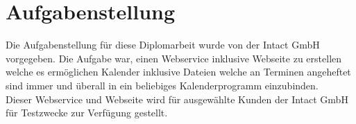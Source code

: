 \renewcommand{\theauthor}{Matthias Franz}

\section{Aufgabenstellung}
\label{sec:Aufgabenstellung}
Die Aufgabenstellung für diese Diplomarbeit wurde von der Intact GmbH vorgegeben. Die Aufgabe war, einen Webservice inklusive Webseite zu erstellen welche es ermöglichen Kalender inklusive Dateien welche an Terminen angeheftet sind immer und überall in ein beliebiges Kalenderprogramm einzubinden. \\
Dieser Webservice und Webseite wird für ausgewählte Kunden der Intact GmbH für Testzwecke zur Verfügung gestellt.